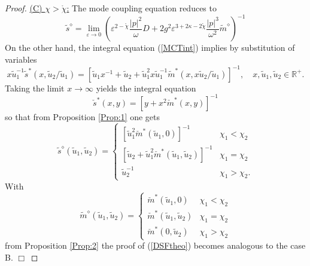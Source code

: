 \documentclass[12pt]{article}
\newcommand{\R}{{\mathbb R}}
\def\qed{\hfill$\Box$\par\medskip\par\relax}
\begin{document}
\begin{proof}
\noindent \underline{(C) $\chi > \mathring{\chi}$:} 
The mode coupling equation reduces to
\begin{equation}
\tilde{s}^{\diamond} %
= \lim_{\varepsilon \to 0} 
\left(\varepsilon^{2-\mathring{\chi}} \frac{|p|^2}{\omega} D  
+ 2 g^2  \varepsilon^{3+2\kappa-2\mathring{\chi}} \frac{|p|^3}{\omega^2}
\tilde{m}^{\diamond}
\right)^{-1}
\label{dMCTLFT4C}
\end{equation}
On the other hand, the integral equation (\ref{MCTint}) implies by 
substitution of variables
\begin{equation}
x \tilde{u}_1^{-1} \tilde{s}^{\ast} (x,\tilde{u}_2/\tilde{u}_1)
=  \left[\tilde{u}_1 x^{-1}+ \tilde{u}_2 + \tilde{u}_1^2 x \tilde{u}_1^{-1} \tilde{m}^{\ast}(x,x\tilde{u}_2/\tilde{u}_1) \right]^{-1}, 
\quad x,\tilde{u}_1,\tilde{u}_2 \in \R^+.
\end{equation}
Taking the limit $x\to\infty$ yields the integral equation
\begin{equation}
\check{s}^{\ast}(x,y)
=  \left[y + x^2 \check{m}^{\ast}(x,y) \right]^{-1}
\label{checkMCT}
\end{equation}
so that from Proposition \ref{Prop:1} one gets
\begin{equation}
\tilde{s}^{\diamond}(\tilde{u}_1,\tilde{u}_2)
=  \left\{
\begin{array}{ll}
\left[\tilde{u}_1^2 \check{m}^{\ast}(\tilde{u}_1,0) \right]^{-1} & \chi_1 < \chi_2 \\
\left[\tilde{u}_2 + \tilde{u}_1^2 \check{m}^{\ast}(\tilde{u}_1,\tilde{u}_2) \right]^{-1} & \chi_1 = \chi_2 \\
\tilde{u}_2^{-1} & \chi_1 > \chi_2 .
\end{array} \right.  
\label{tsb2b}
\end{equation}
With
\begin{equation}
\tilde{m}^{\diamond}(\tilde{u}_1,\tilde{u}_2)
= \left\{
\begin{array}{ll}
\check{m}^\ast
(\tilde{u}_1,0) & \chi_1 < \chi_2 \\
\check{m}^\ast
(\tilde{u}_1,\tilde{u}_2) & \chi_1 = \chi_2 \\
\check{m}^\ast
(0,\tilde{u}_2) & \chi_1 > \chi_2 
\end{array} \right. 
\end{equation}
from Proposition \ref{Prop:2} the proof of (\ref{DSFtheo})
becomes analogous to the case B.
\qed
\end{proof}
\end{document}
